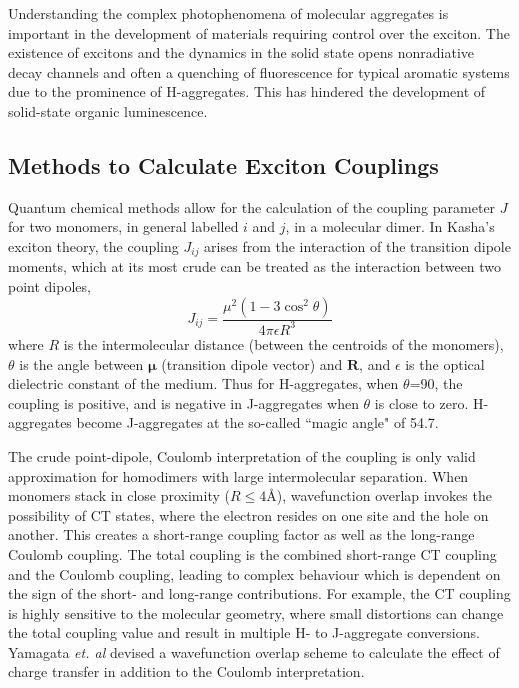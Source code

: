 Understanding the complex photophenomena of molecular aggregates is important in the development of materials requiring control over the exciton. The existence of excitons and the dynamics in the solid state opens nonradiative decay channels and often a quenching of fluorescence for typical aromatic systems due to the prominence of H-aggregates. This has hindered the development of solid-state organic luminescence. 

\subsection{Methods to Calculate Exciton Couplings}\label{section: lom exciton_couplings}
Quantum chemical methods allow for the calculation of the coupling parameter  $J$ for two monomers, in general labelled  $i$ and $j$, in a molecular dimer. In Kasha's exciton theory, the coupling $J_{ij}$ arises from the interaction of the transition dipole moments, which at its most crude can be treated as the interaction between two point dipoles,
\begin{equation}\label{equation: PDA}
    J_{ij}=\frac{\mu^{2}(1-3\cos^{2}\theta)}{4\pi\epsilon{}R^3}
\end{equation}
where $R$ is the intermolecular distance (between the centroids of the monomers), $\theta$ is the angle between  $\bm{\mu}$ (transition dipole vector) and $\bm{R}$, and $\epsilon$ is the optical dielectric constant of the medium. Thus for H-aggregates, when $\theta$=90\degree{}, the coupling is positive, and is negative in J-aggregates when $\theta$ is close to zero. H-aggregates become J-aggregates at the so-called ``magic angle" of 54.7\textdegree.\cite{Hestand2018}

The crude point-dipole, Coulomb interpretation of the coupling is only valid approximation for homodimers with large intermolecular separation.\cite{Kistler2013} When monomers stack in close proximity ($R\leq4\si{\angstrom}$), wavefunction overlap invokes the possibility of \ac{CT} states, where the electron resides on one site and the hole on another.\cite{Darghouth2018} This creates a short-range coupling factor as well as the long-range Coulomb coupling. The total coupling is the combined short-range \ac{CT} coupling and the Coulomb coupling, leading to complex behaviour which is dependent on the sign of the short- and long-range contributions. For example, the \ac{CT} coupling is highly sensitive to the molecular geometry, where small distortions can change the total coupling value and result in multiple H- to J-aggregate conversions.\cite{Arago2015} Yamagata \textit{et. al} devised a wavefunction overlap scheme to calculate the effect of charge transfer in addition to  the Coulomb interpretation.\cite{Yamagata2012} %

